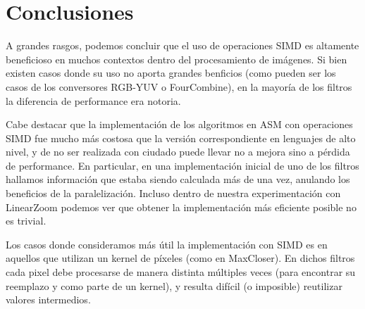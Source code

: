 \section{Conclusiones}
	A grandes rasgos, podemos concluir que el uso de operaciones SIMD es altamente beneficioso en muchos contextos dentro del procesamiento de imágenes. Si bien existen casos donde su uso no aporta grandes benficios (como pueden ser los casos de los conversores RGB-YUV o FourCombine), en la mayoría de los filtros la diferencia de performance era notoria.

	Cabe destacar que la implementación de los algoritmos en ASM con operaciones SIMD fue mucho más costosa que la versión correspondiente en lenguajes de alto nivel, y de no ser realizada con ciudado puede llevar no a mejora sino a pérdida de performance. En particular, en una implementación inicial de uno de los filtros hallamos información que estaba siendo calculada más de una vez, anulando los beneficios de la paralelización. Incluso dentro de nuestra experimentación con LinearZoom podemos ver que obtener la implementación más eficiente posible no es trivial.

	Los casos donde consideramos más útil la implementación con SIMD es en aquellos que utilizan un kernel de píxeles (como en MaxCloser). En dichos filtros cada pixel debe procesarse de manera distinta múltiples veces (para encontrar su reemplazo y como parte de un kernel), y resulta difícil (o imposible) reutilizar valores intermedios.